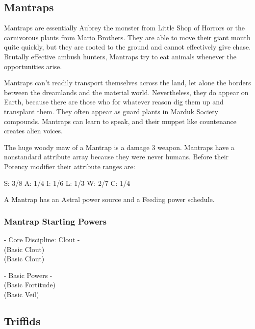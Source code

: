 \subsection{Mantraps} 

Mantraps are essentially Aubrey the monster from Little Shop of Horrors or the carnivorous plants from Mario Brothers. They are able to move their giant mouth quite quickly, but they are rooted to the ground and cannot effectively give chase. Brutally effective ambush hunters, Mantraps try to eat animals whenever the opportunities arise.

Mantraps can't readily transport themselves across the land, let alone the borders between the dreamlands and the material world. Nevertheless, they do appear on Earth, because there are those who for whatever reason dig them up and transplant them. They often appear as guard plants in Marduk Society compounds. Mantraps can learn to speak, and their muppet like countenance creates alien voices.

The huge woody maw of a Mantrap is a damage 3 weapon. Mantraps have a nonstandard attribute array because they were never humans. Before their Potency modifier their attribute ranges are:

S: 3/8 A: 1/4 I: 1/6 L: 1/3 W: 2/7 C: 1/4

A Mantrap has an Astral power source and a Feeding power schedule.

\subsubsection{Mantrap Starting Powers}

\hspace{\parindent} - Core Discipline: Clout -\\
 (Basic Clout)\\
 (Basic Clout)

- Basic Powers -\\
 (Basic Fortitude)\\
 (Basic Veil)



\subsection{Triffids} 

